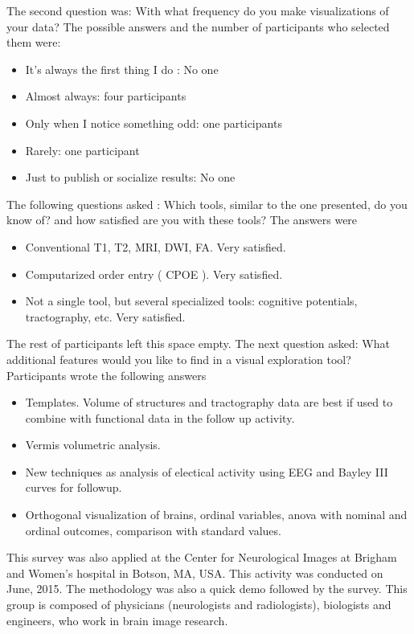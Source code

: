 The second question was: With what frequency do you make visualizations of your data? The possible answers and the number of participants who selected them were:

\begin{itemize}
	\item It's always the first thing I do : No one
	\item Almost always: four participants
	\item Only when I notice something odd: one participants
	\item Rarely: one participant
	\item Just to publish or socialize results: No one
\end{itemize}

The following questions asked : Which tools, similar to the one presented, do you know of? and how satisfied are you with these tools? The answers were 
\begin{itemize}
	\item Conventional T1, T2, MRI, DWI, FA. Very satisfied.
	\item Computarized order entry ( CPOE ). Very satisfied.
	\item Not a single tool, but several specialized tools: cognitive potentials, tractography, etc. Very satisfied.
\end{itemize}

The rest of participants left this space empty. The next question asked: What additional features would you like to find in a visual exploration tool? Participants wrote the following answers
\begin{itemize}
	\item Templates. Volume of structures and tractography data are best if used to combine with functional data in the follow up activity. 
	\item Vermis volumetric analysis.
	\item New techniques as analysis of electical activity using EEG and Bayley III curves for followup. 
	\item Orthogonal visualization of brains, ordinal variables, anova with nominal and ordinal outcomes, comparison with standard values.
\end{itemize}

This survey was also applied at the Center for Neurological Images at Brigham and Women's hospital in Botson, MA, USA. This activity was conducted on June, 2015. The methodology was also a quick demo followed by the survey. This group is composed of physicians (neurologists and radiologists), biologists and engineers, who work in brain image research. 

